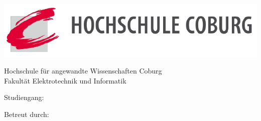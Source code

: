 
\begin{titlepage}

\begin{center}
\includegraphics[width=\textwidth]{Bilder/Titelseite/Logo_HS_Coburg}

\begin{Large}
	Hochschule für angewandte Wissenschaften Coburg\\
	Fakultät Elektrotechnik und Informatik
	\par
\end{Large}

\vspace{1.5cm}
        
\begin{Large}
	Studiengang: \Studiengang
\par
\end{Large}

\vspace{1.5cm}
        
\begin{Large}
	\Dokumententitel
	
	Betreut durch: \Betreuer
\end{Large}

\vspace{1cm}
        
\begin{huge}
	\Autorenname
\end{huge}

\vspace{1.5cm}   



\end{center}
\end{titlepage}
